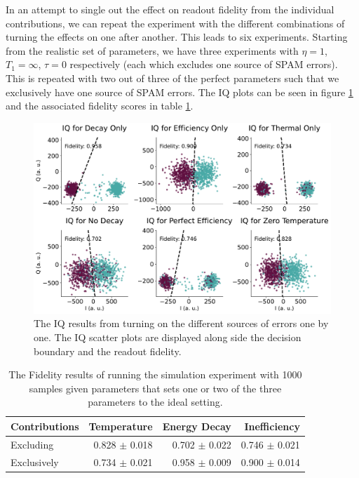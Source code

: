 In an attempt to single out the effect on readout fidelity from the individual contributions, we can repeat the experiment with the different combinations of turning the effects on one after another. This leads to six experiments. Starting from the realistic set of parameters, we have three experiments with $\eta = 1$, $T_1 = \infty$, $\tau = 0$ respectively (each which excludes one source of SPAM errors). This is repeated with two out of three of the perfect parameters such that we exclusively have one source of SPAM errors. The IQ plots can be seen in figure \ref{fig:on_off_IQ_scatter_combinations} and the associated fidelity scores in table \ref{tab:readout_infidelity_contribution_estimation}.
\begin{figure}[h]
    \centering
    \includegraphics[]{Simulations/budgets/figures/iq_scatter_budgetting_on_off.pdf}
    \caption{The IQ results from turning on the different sources of errors one by one. The IQ scatter plots are displayed along side the decision boundary and the readout fidelity.}
    \label{fig:on_off_IQ_scatter_combinations}
\end{figure}
\begin{table}[h]
\centering
\caption{The Fidelity results of running the simulation experiment with 1000 samples given parameters that sets one or two of the three parameters to the ideal setting.}
\begin{tabular}{l|rrr}
\hline
\textbf{Contributions}        & Temperature         & Energy Decay   & Inefficiency\\ \hline
Excluding                     &  0.828 $\pm$ 0.018  &  0.702 $\pm$  0.022  &  0.746 $\pm$ 0.021\\
Exclusively                   &  0.734 $\pm$ 0.021  &  0.958 $\pm$  0.009  &  0.900 $\pm$ 0.014
\end{tabular}
\vspace{0.3 cm}
\label{tab:readout_infidelity_contribution_estimation}
\end{table}


